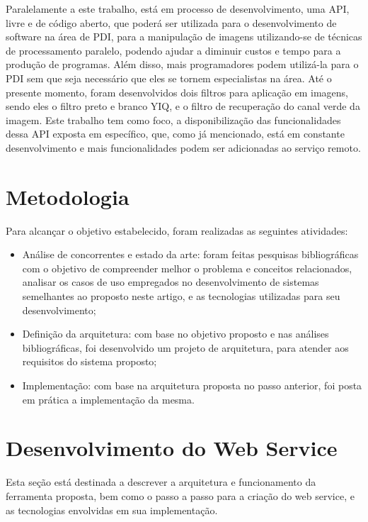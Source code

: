 \documentclass[12pt]{article}
\begin{document}
Paralelamente a este trabalho, está em processo de desenvolvimento, uma API, livre e de código aberto, que poderá ser utilizada para o desenvolvimento de software na área de PDI, para a manipulação de imagens utilizando-se de técnicas de processamento paralelo, podendo ajudar a diminuir custos e tempo para a produção de programas. Além disso, mais programadores podem utilizá-la para o PDI sem que seja necessário que eles se tornem especialistas na área.
Até o presente momento, foram desenvolvidos dois filtros para aplicação em imagens, sendo eles o filtro preto e branco YIQ, e o filtro de recuperação do canal verde da imagem. Este trabalho tem como foco, a disponibilização das funcionalidades dessa API exposta em específico, que, como já mencionado, está em constante desenvolvimento e mais funcionalidades podem ser adicionadas ao serviço remoto.

\section{Metodologia}

Para alcançar o objetivo estabelecido, foram realizadas as seguintes atividades:
\begin{itemize}
	\item Análise de concorrentes e estado da arte: foram feitas pesquisas bibliográficas com o objetivo de compreender melhor o problema e conceitos relacionados, analisar os casos de uso empregados no desenvolvimento de sistemas semelhantes ao proposto neste artigo, e as tecnologias utilizadas para seu desenvolvimento;
	\item Definição da arquitetura: com base no objetivo proposto e nas análises bibliográficas, foi desenvolvido um projeto de arquitetura, para atender aos requisitos do sistema proposto;
	\item Implementação: com base na arquitetura proposta no passo anterior, foi posta em prática a implementação da mesma.
\end{itemize}

\section{Desenvolvimento do Web Service}

Esta seção está destinada a descrever a arquitetura e funcionamento da ferramenta proposta, bem como o passo a passo para a criação do web service, e as tecnologias envolvidas em sua implementação.


\end{document}

